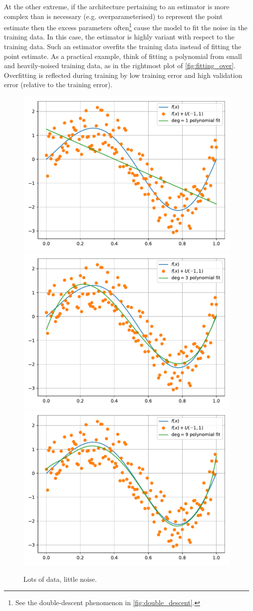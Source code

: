 \documentclass[11pt]{article}
\begin{document}
At the other extreme, if the architecture pertaining to an estimator is more complex than is necessary (e.g. overparameterised) to represent the point estimate then the excess parameters often\footnote{See the double-descent phenomenon in \autoref{fig:double_descent}.} cause the model to fit the noise in the training data. In this case, the estimator is highly variant with respect to the training data. Such an estimator overfits the training data instead of fitting the point estimate. As a practical example, think of fitting a polynomial from small and heavily-noised training data, as in the rightmost plot of \autoref{fig:fitting_over}. Overfitting is reflected during training by low training error and high validation error (relative to the training error).

\begin{figure}[t]
    \centering
    \includegraphics[width=0.32\columnwidth]{./figures/supervised_learning/fitting_under_M=1.pdf}
    \includegraphics[width=0.32\columnwidth]{./figures/supervised_learning/fitting_under_M=3.pdf}
    \includegraphics[width=0.32\columnwidth]{./figures/supervised_learning/fitting_under_M=9.pdf}
    \caption{Lots of data, little noise.}
    \label{fig:fitting_under}
\end{figure}
\end{document}

